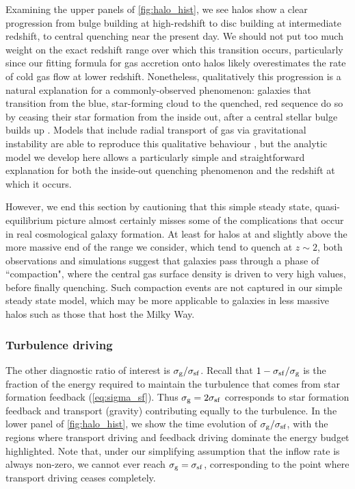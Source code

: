 \documentclass[useAMS,usenatbib]{mn2e}
\begin{document}
Examining the upper panels of \autoref{fig:halo_hist}, we see halos show a clear progression from bulge building at high-redshift to disc building at intermediate redshift, to central quenching near the present day. We should not put too much weight on the exact redshift range over which this transition occurs, particularly since our fitting formula for gas accretion onto halos likely overestimates the rate of cold gas flow at lower redshift. Nonetheless, qualitatively this progression is a natural explanation for a commonly-observed phenomenon: galaxies that transition from the blue, star-forming cloud to the quenched, red sequence do so by ceasing their star formation from the inside out, after a central stellar bulge builds up \citep[e.g.,][]{fang12a, fang13a, cheung12a, genzel14a, nelson16a, belfiore17a}. Models that include radial transport of gas via gravitational instability are able to reproduce this qualitative behaviour \citep[e.g.,][]{forbes12a, cacciato12a, forbes14a, tonini16a, stevens16a}, but the analytic model we develop here allows a particularly simple and straightforward explanation for both the inside-out quenching phenomenon and the redshift at which it occurs. 

However, we end this section by cautioning that this simple steady state, quasi-equilibrium picture almost certainly misses some of the complications that occur in real cosmological galaxy formation. At least for halos at and slightly above the more massive end of the range we consider, which tend to quench at $z\sim 2$, both observations \citep{barro13a, barro16a, barro17a, tacchella15a, tacchella18a} and simulations \citep{zolotov15a, tacchella16a, tacchella16b} suggest that galaxies pass through a phase of ``compaction", where the central gas surface density is driven to very high values, before finally quenching. Such compaction events are not captured in our simple steady state model, which may be more applicable to galaxies in less massive halos such as those that host the Milky Way.

\subsubsection{Turbulence driving}

The other diagnostic ratio of interest is $\sigma_{\rm g} / \sigma_{\rm sf}$. Recall that $1-\sigma_{\rm sf}/\sigma_{\rm g}$ is the fraction of the energy required to maintain the turbulence that comes from star formation feedback (\autoref{eq:sigma_sf}). Thus $\sigma_{\rm g} = 2 \sigma_{\rm sf}$ corresponds to star formation feedback and transport (gravity) contributing equally to the turbulence. In the lower panel of \autoref{fig:halo_hist}, we show the time evolution of $\sigma_{\rm g} / \sigma_{\rm sf}$, with the regions where transport driving and feedback driving dominate the energy budget highlighted. Note that, under our simplifying assumption that the inflow rate is always non-zero, we cannot ever reach $\sigma_{\rm g} = \sigma_{\rm sf}$, corresponding to the point where transport driving ceases completely.
\end{document}
